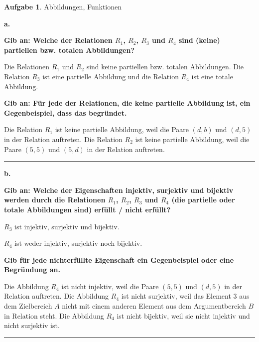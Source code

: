 \documentclass[10pt,leqno ]{article}
\theoremstyle{definition}
\newtheorem{problem}[theorem]{Aufgabe}
\newenvironment{solution}[1][L]{\begin{doublespace}\textbf{#1.}\quad }{\ \rule{0.5em}{0.5em}\end{doublespace}}
\begin{document}

\begin{problem}
    Abbildungen, Funktionen
\end{problem}
\begin{solution}[a]

\textbf{Gib an: Welche der Relationen \(R_1\), \(R_2\), \(R_3\) und \(R_4\) sind (keine) partiellen bzw. totalen Abbildungen?}

Die Relationen \(R_1\) und \(R_2\) sind keine partiellen bzw. totalen Abbildungen. 
Die Relation \(R_3\) ist eine partielle Abbildung und die Relation \(R_4\) ist eine totale Abbildung.

\textbf{Gib an: Für jede der Relationen, die keine partielle Abbildung ist, ein Gegenbeispiel, dass das begründet.}

Die Relation \(R_1\) ist keine partielle Abbildung, weil die Paare \((d,b)\) und \((d,5)\) in der Relation auftreten.
Die Relation \(R_2\) ist keine partielle Abbildung, weil die Paare \((5,5)\) und \((5,d)\) in der Relation auftreten.
\end{solution}

\begin{solution}[b]

\textbf{Gib an: Welche der Eigenschaften injektiv, surjektiv und bijektiv werden durch die Relationen \(R_1\), \(R_2\), \(R_3\) und \(R_4\) (die partielle oder totale Abbildungen sind) erfüllt / nicht erfüllt?}

\(R_3\) ist injektiv, surjektiv und bijektiv.

\(R_4\) ist weder injektiv, surjektiv noch bijektiv. 

\textbf{Gib für jede nichterfüllte Eigenschaft ein Gegenbeispiel oder eine Begründung an.}

Die Abbildung \(R_4\) ist nicht injektiv, weil die Paare \((5,5)\) und \((d,5)\) in der Relation auftreten.
Die Abbildung \(R_4\) ist nicht surjektiv, weil das Element \(3\) aus dem Zielbereich \(A\) nicht mit einem anderen Element aus dem Argumentbereich \(B\) in Relation steht.
Die Abbildung \(R_4\) ist nicht bijektiv, weil sie nicht injektiv und nicht surjektiv ist.
\end{solution}
\end{document}
